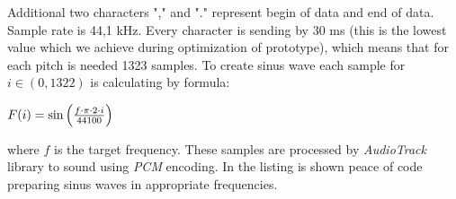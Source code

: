 \documentclass[11pt,titlepage]{article}
\theoremstyle{plain}
\begin{document}
Additional two characters "," and "." represent begin of data and end of data. Sample rate is 44,1 kHz. Every character is sending by 30 ms (this is the lowest value which we achieve during optimization of prototype), which means that for each pitch is needed 1323 samples. To create sinus wave each sample for $ i \in (0,1322) $ is calculating by formula:
\begin{center}
$F(i) = \sin\left( f \cdot \pi \cdot 2 \cdot i  \over 44 100  \right)$
\end{center}
where $f$ is the target frequency.
These samples are processed by \textit{AudioTrack} library to sound using \textit{PCM} encoding. In the listing is shown peace of code preparing sinus waves in appropriate frequencies.


\end{document}
